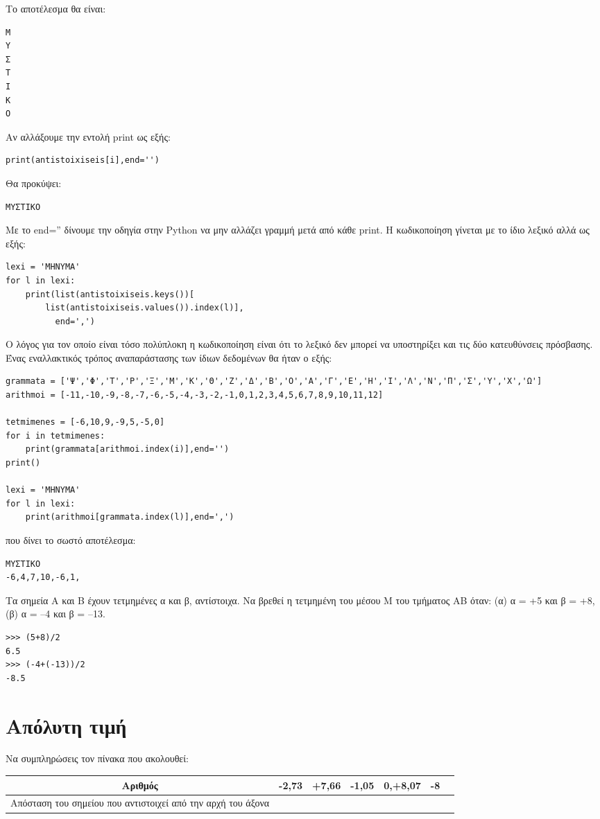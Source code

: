 Το αποτέλεσμα θα είναι:
\begin{lstlisting}
Μ
Υ
Σ
T
Ι
Κ
Ο
\end{lstlisting}
Αν αλλάξουμε την εντολή print ως εξής:
\begin{lstlisting}
print(antistoixiseis[i],end='')
\end{lstlisting}
Θα προκύψει:
\begin{lstlisting}
ΜΥΣΤΙΚΟ
\end{lstlisting}
Με το end='' δίνουμε την οδηγία στην Python να μην αλλάζει γραμμή μετά από κάθε print.
H κωδικοποίηση γίνεται με το ίδιο λεξικό αλλά ως εξής:
\begin{lstlisting}
lexi = 'ΜΗΝΥΜΑ'
for l in lexi:
    print(list(antistoixiseis.keys())[
        list(antistoixiseis.values()).index(l)],
          end=',')
\end{lstlisting}
Ο λόγος για τον οποίο είναι τόσο πολύπλοκη η κωδικοποίηση είναι ότι το λεξικό δεν μπορεί να υποστηρίξει και τις δύο κατευθύνσεις πρόσβασης. Ένας εναλλακτικός τρόπος αναπαράστασης των ίδιων δεδομένων θα ήταν ο εξής:
\begin{lstlisting}
grammata = ['Ψ','Φ','T','Ρ','Ξ','Μ','Κ','Θ','Ζ','Δ','Β','Ο','Α','Γ','Ε','Η','Ι','Λ','Ν','Π','Σ','Υ','Χ','Ω']
arithmoi = [-11,-10,-9,-8,-7,-6,-5,-4,-3,-2,-1,0,1,2,3,4,5,6,7,8,9,10,11,12]

tetmimenes = [-6,10,9,-9,5,-5,0]
for i in tetmimenes:
    print(grammata[arithmoi.index(i)],end='')
print()

lexi = 'ΜΗΝΥΜΑ'
for l in lexi:
    print(arithmoi[grammata.index(l)],end=',')
\end{lstlisting}
που δίνει το σωστό αποτέλεσμα:
\begin{lstlisting}
ΜΥΣTΙΚΟ
-6,4,7,10,-6,1,
\end{lstlisting}
\begin{exercise}
Τα σημεία Α και Β έχουν τετμημένες α και β, αντίστοιχα. Να βρεθεί η τετμημένη του μέσου Μ του τμήματος ΑΒ όταν: (α) α = +5 και β = +8, (β) α = –4 και β = –13.
\end{exercise}
\begin{lstlisting}
>>> (5+8)/2
6.5
>>> (-4+(-13))/2
-8.5
\end{lstlisting}
\section{Απόλυτη τιμή}
Να συμπληρώσεις τον πίνακα που ακολουθεί:
\begin{table}[h]
\begin{tabular}{|c|c|c|c|c|c|c|}
\hline
Αριθμός& -2,73 & +7,66 & -1,05 & 0,+8,07 & -8\\\hline
Aπόσταση του σημείου που αντιστοιχεί από την αρχή του άξονα &&&&&\\\hline
\end{tabular}
\end{table}

